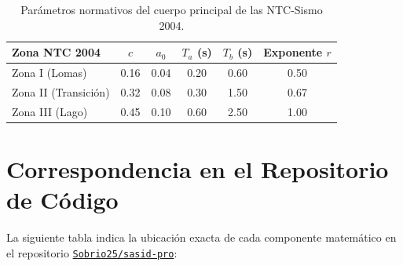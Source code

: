 \documentclass[11pt,a4paper]{article}
\begin{document}
\begin{table}[h!]
\centering
\small
\renewcommand{\arraystretch}{1.15}
\begin{tabular}{lccccc}
\toprule
\textbf{Zona NTC 2004} & \textbf{$c$} & \textbf{$a_0$} & \textbf{$T_a$ (s)} & \textbf{$T_b$ (s)} & \textbf{Exponente $r$} \\
\midrule
Zona I (Lomas)        & 0.16 & 0.04 & 0.20 & 0.60 & 0.50 \\
Zona II (Transición)  & 0.32 & 0.08 & 0.30 & 1.50 & 0.67 \\
Zona III (Lago)       & 0.45 & 0.10 & 0.60 & 2.50 & 1.00 \\
\bottomrule
\end{tabular}
\caption{Parámetros normativos del cuerpo principal de las NTC-Sismo 2004.}
\end{table}

\vspace{0.2cm}

\section{Correspondencia en el Repositorio de Código}
La siguiente tabla indica la ubicación exacta de cada componente matemático en el repositorio \href{https://github.com/Sobrio25/sasid-pro}{\texttt{Sobrio25/sasid-pro}}:
\end{document}
